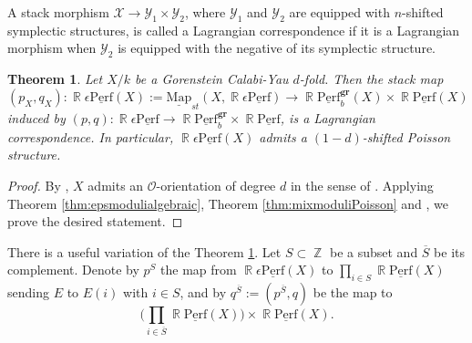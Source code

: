 \documentclass[reqno]{amsart}
\DeclareMathOperator\Z{\mathbb Z}
\DeclareMathOperator\R{\mathbb R}
\newtheorem{theorem}{Theorem}[section]
\theoremstyle{definition}
\theoremstyle{remark}
\newcommand{\ul}{\underline}
\newcommand{\eps}{\epsilon}
\newcommand{\uperf}{\ul{\mathrm{Perf}}}
\newcommand{\gr}{\mathbf{gr}}
\newcommand{\ol}{\overline}
\newcommand{\cO}{\mathcal{O}}
\newcommand{\Map}{{\mathrm{Map}}}
\newcommand{\sX}{\mathscr{X}}
\newcommand{\sY}{\mathscr{Y}}
\numberwithin{equation}{section}
\begin{document}
A stack morphism $\sX\to \sY_1\times \sY_2$, where $\sY_1$ and $\sY_2$ are equipped with $n$-shifted symplectic structures, 
is called a Lagrangian correspondence if it is a Lagrangian morphism when $\sY_2$ is equipped with the negative of its symplectic structure.  

\begin{theorem}\label{thm:Lag}
Let $X/k$ be a Gorenstein Calabi-Yau $d$-fold. Then the stack map
\[
(p_X,q_X): \R\eps\uperf(X):=\ul\Map_{st}(X,\R\eps\uperf)\to \R\uperf^\gr_b(X)\times\R\uperf(X)
\] induced by $(p,q): \R\eps\uperf\to \R\uperf^\gr_b\times \R\uperf$, is a Lagrangian correspondence. In particular, $\R\eps\uperf(X)$ admits a $(1-d)$-shifted Poisson structure.
\end{theorem}
\begin{proof}
By \cite[Lemma 3.4]{HP3}, $X$ admits an $\cO$-orientation of degree $d$ in the sense of \cite[Definition 2.4]{PTVV}. Applying Theorem \ref{thm:epsmodulialgebraic}, Theorem \ref{thm:mixmoduliPoisson} and \cite[Theorem 2.5]{PTVV}, we prove the desired statement.
\end{proof}






There is a useful variation of the Theorem \ref{thm:Lag}. Let $S\subset \Z$ be a subset and $\ol{S}$ be its complement. Denote by $p^{S}$ the map from $\R\eps\uperf(X)$ to $\prod_{i\in S} \R\uperf(X)$ sending $E$ to $E(i)$ with $i\in S$, and by $q^{\ol{S}}:=(p^{\ol{S}},q)$ be the map to 
\[
\Big(\prod_{i\in \ol{S}} \R\uperf(X)\Big)\times \R\uperf(X).
\]
\end{document}
